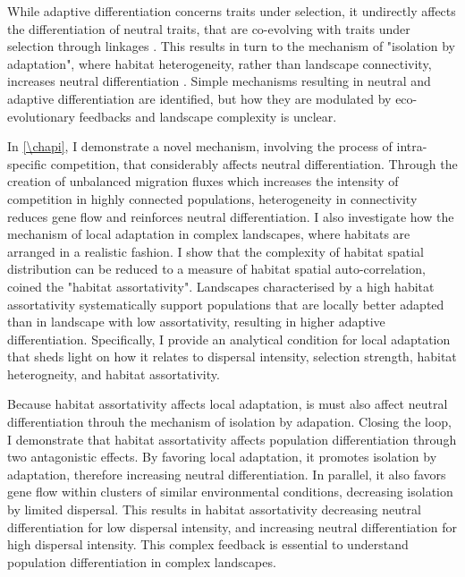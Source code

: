 % 
While adaptive differentiation concerns traits under selection, it undirectly affects the differentiation of neutral traits, that are co-evolving with traits under selection through linkages \citep{Billiard2015,Lepers2021}. This results in turn to the mechanism of "isolation by adaptation", where habitat heterogeneity, rather than landscape connectivity, increases neutral differentiation \citep{nosil2008}. 
% 
Simple mechanisms resulting in neutral and adaptive differentiation are identified, but how they are modulated by eco-evolutionary feedbacks and landscape complexity is unclear. %

In \cref{\chapi}, I demonstrate a novel mechanism, involving the process of intra-specific competition, that considerably affects neutral differentiation. Through the creation of unbalanced migration fluxes which increases the intensity of competition in highly connected populations, heterogeneity in connectivity reduces gene flow and reinforces neutral differentiation. %
% 
I also investigate how the mechanism of local adaptation in complex landscapes, where habitats are arranged in a realistic fashion. I show that the complexity of habitat spatial distribution can be reduced to a measure of habitat spatial auto-correlation, coined the "habitat assortativity". Landscapes characterised by a high habitat assortativity systematically support populations that are locally better adapted than in landscape with low assortativity, resulting in higher adaptive differentiation. Specifically, I provide an analytical condition for local adaptation that sheds light on how it relates to dispersal intensity, selection strength, habitat heterogneity, and habitat assortativity.

Because habitat assortativity affects local adaptation, is must also affect neutral differentiation throuh the mechanism of isolation by adapation. Closing the loop, I demonstrate that habitat assortativity affects population differentiation through two antagonistic effects. By favoring local adaptation, it promotes isolation by adaptation, therefore increasing neutral differentiation. In parallel, it also favors gene flow within clusters of similar environmental conditions, decreasing isolation by limited dispersal. This results in habitat assortativity decreasing neutral differentiation for low dispersal intensity, and increasing neutral differentiation for high dispersal intensity.
% 
This complex feedback is essential to understand population differentiation in complex landscapes.

